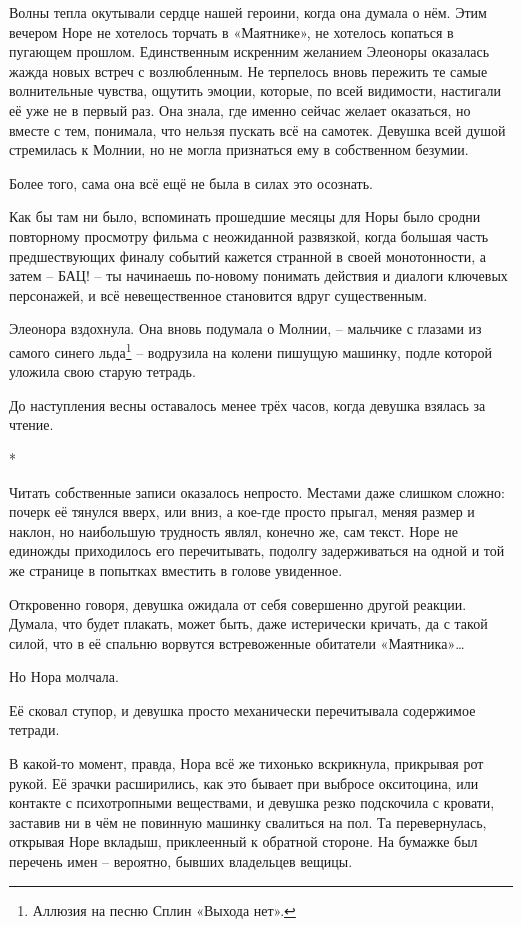 \documentclass[
  a5paperpaper,
  DIV=11,
  numbers=noendperiod]{scrreprt}
\begin{document}
Волны тепла окутывали сердце нашей героини, когда она думала о нём. Этим
вечером Норе не хотелось торчать в «Маятнике», не хотелось копаться в
пугающем прошлом. Единственным искренним желанием Элеоноры оказалась
жажда новых встреч с возлюбленным. Не терпелось вновь пережить те самые
волнительные чувства, ощутить эмоции, которые, по всей видимости,
настигали её уже не в первый раз. Она знала, где именно сейчас желает
оказаться, но вместе с тем, понимала, что нельзя пускать всё на самотек.
Девушка всей душой стремилась к Молнии, но не могла признаться ему в
собственном безумии.

Более того, сама она всё ещё не была в силах это осознать.

Как бы там ни было, вспоминать прошедшие месяцы для Норы было сродни
повторному просмотру фильма с неожиданной развязкой, когда большая часть
предшествующих финалу событий кажется странной в своей монотонности, а
затем -- БАЦ! -- ты начинаешь по-новому понимать действия и диалоги
ключевых персонажей, и всё невещественное становится вдруг существенным.

Элеонора вздохнула. Она вновь подумала о Молнии, -- мальчике с глазами
из самого синего льда\footnote{Аллюзия на песню Сплин «Выхода нет».} --
водрузила на колени пишущую машинку, подле которой уложила свою старую
тетрадь.

До наступления весны оставалось менее трёх часов, когда девушка взялась
за чтение.

*

Читать собственные записи оказалось непросто. Местами даже слишком
сложно: почерк её тянулся вверх, или вниз, а кое-где просто прыгал,
меняя размер и наклон, но наибольшую трудность являл, конечно же, сам
текст. Норе не единожды приходилось его перечитывать, подолгу
задерживаться на одной и той же странице в попытках вместить в голове
увиденное.

Откровенно говоря, девушка ожидала от себя совершенно другой реакции.
Думала, что будет плакать, может быть, даже истерически кричать, да с
такой силой, что в её спальню ворвутся встревоженные обитатели
«Маятника»\ldots{}

Но Нора молчала.

Её сковал ступор, и девушка просто механически перечитывала содержимое
тетради.

В какой-то момент, правда, Нора всё же тихонько вскрикнула, прикрывая
рот рукой. Её зрачки расширились, как это бывает при выбросе окситоцина,
или контакте с психотропными веществами, и девушка резко подскочила с
кровати, заставив ни в чём не повинную машинку свалиться на пол. Та
перевернулась, открывая Норе вкладыш, приклеенный к обратной стороне. На
бумажке был перечень имен -- вероятно, бывших владельцев вещицы.
\end{document}

